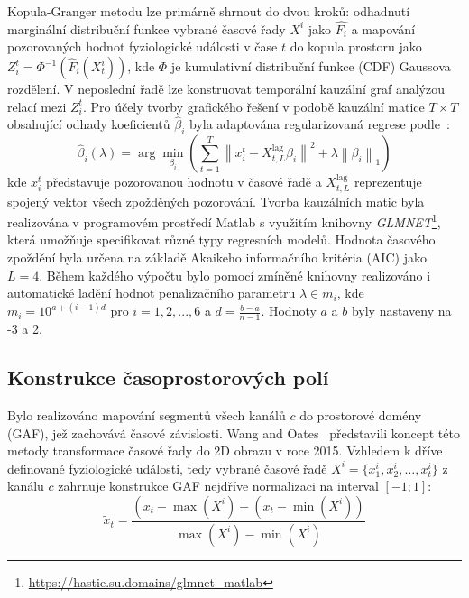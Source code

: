 Kopula-Granger metodu lze primárně shrnout do dvou kroků: odhadnutí marginální
distribuční funkce vybrané časové řady $X^i$ jako $\hat{F_i}$ a mapování
pozorovaných hodnot fyziologické události v čase $t$ do kopula prostoru jako
$Z_{i}^t=\Phi^{-1}\left(\hat{F}_i\left(X_{t}^i\right)\right)$, kde $\Phi$ je
kumulativní distribuční funkce (\gls{CDF}) Gaussova rozdělení. V neposlední řadě
lze konstruovat temporální kauzální graf analýzou relací mezi $Z_{i}^t$. Pro
účely tvorby grafického řešení v podobě kauzální matice $T \times T$ obsahující
odhady koeficientů $\hat{\beta}_i$ byla adaptována regularizovaná regrese
podle~\cite{Bahdori2012}:
\begin{equation}
    \hat{\beta}_i(\lambda)=\arg \min _{\beta_i}\left(\sum_{t=1}^T\left\|x_i^t-X_{t, L}^{\text {lag}} \beta_i\right\|^2+\lambda\left\|\beta_i\right\|_1\right)
\end{equation}
kde $x_i^t$ představuje pozorovanou hodnotu v časové řadě a $X_{t, L}^{\text {lag}}$
reprezentuje spojený vektor všech zpožděných pozorování. Tvorba
kauzálních matic byla realizována v programovém prostředí Matlab s využitím
knihovny \textit{GLMNET}\footnote{\url{https://hastie.su.domains/glmnet_matlab}},
která umožňuje specifikovat různé typy regresních modelů. Hodnota časového
zpoždění byla určena na základě Akaikeho informačního kritéria (\gls{AIC}) jako
$L = 4$. Během každého výpočtu bylo pomocí zmíněné knihovny realizováno i
automatické ladění hodnot penalizačního parametru $\lambda \in m_i$, kde $m_i =
    10^{a + (i-1)d}$ pro $i = {1, 2, ..., 6}$ a $d = \frac{b-a}{n-1}$. Hodnoty $a$ a
$b$ byly nastaveny na -3 a 2.

\subsection{Konstrukce časoprostorových polí}
\label{subsec:gadf}
Bylo realizováno mapování segmentů všech kanálů $c$ do prostorové domény
(\gls{GAF}), jež zachovává časové závislosti. Wang and Oates~\cite{Wang2015}
představili koncept této metody transformace časové řady do 2D obrazu v roce
2015. Vzhledem k dříve definované fyziologické události, tedy vybrané časové
řadě $X^i = \{x_1^i, x_2^i, \dots, x_t^i\}$ z kanálu $c$ zahrnuje konstrukce
\gls{GAF} nejdříve normalizaci na interval $[-1; 1]$:
\begin{equation}
    \tilde{x}_t=\frac{\left(x_t-\max (X^i)+\left(x_t-\min (X^i)\right)\right.}{\max (X^i)-\min (X^i)}
\end{equation}

